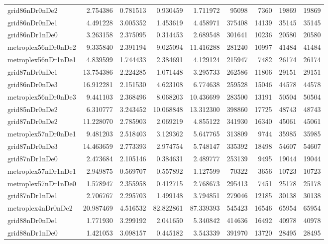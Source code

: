 \begin{longtable}{|l|r|r|r|r|r|r|r|r|}
grid86nDr0nDe2 & 2.754386 & 0.781513 & 0.930459 & 1.711972 & 95098 & 7360 & 19869 & 19869 \\
grid86nDr0nDe1 & 4.491228 & 3.005352 & 1.453619 & 4.458971 & 375408 & 14139 & 35145 & 35145 \\
grid86nDr1nDe0 & 3.263158 & 2.375095 & 0.314453 & 2.689548 & 301641 & 10236 & 20580 & 20580 \\
metroplex56nDr0nDe2 & 9.335840 & 2.391194 & 9.025094 & 11.416288 & 281240 & 10997 & 41484 & 41484 \\
metroplex56nDr1nDe1 & 4.839599 & 1.744433 & 2.384691 & 4.129124 & 215947 & 7482 & 26174 & 26174 \\
grid87nDr0nDe1 & 13.754386 & 2.224285 & 1.071448 & 3.295733 & 262586 & 11806 & 29151 & 29151 \\
grid86nDr0nDe3 & 16.912281 & 2.151530 & 4.623108 & 6.774638 & 259528 & 15046 & 44578 & 44578 \\
metroplex56nDr0nDe3 & 9.441103 & 2.368496 & 8.068203 & 10.436699 & 283500 & 13191 & 50504 & 50504 \\
grid85nDr0nDe2 & 6.310777 & 3.243452 & 10.068848 & 13.312300 & 398860 & 17725 & 48743 & 48743 \\
grid87nDr0nDe2 & 11.228070 & 2.785903 & 2.069219 & 4.855122 & 341930 & 16340 & 45061 & 45061 \\
metroplex57nDr0nDe1 & 9.481203 & 2.518403 & 3.129362 & 5.647765 & 313809 & 9744 & 35985 & 35985 \\
grid87nDr0nDe3 & 14.463659 & 2.773393 & 2.974754 & 5.748147 & 335392 & 18498 & 54607 & 54607 \\
grid87nDr1nDe0 & 2.473684 & 2.105146 & 0.384631 & 2.489777 & 253139 & 9495 & 19044 & 19044 \\
metroplex57nDr1nDe1 & 2.949875 & 0.569707 & 0.557892 & 1.127599 & 70322 & 3656 & 10723 & 10723 \\
metroplex57nDr1nDe0 & 1.578947 & 2.355958 & 0.412715 & 2.768673 & 295413 & 7451 & 25178 & 25178 \\
grid87nDr1nDe1 & 2.706767 & 2.295703 & 1.499148 & 3.794851 & 279046 & 12185 & 30138 & 30138 \\
metroplex4nDr0nDe2 & 20.987469 & 4.516532 & 82.822861 & 87.339393 & 545423 & 16546 & 65954 & 65954 \\
grid88nDr0nDe1 & 1.771930 & 3.299192 & 2.041650 & 5.340842 & 414636 & 16492 & 40978 & 40978 \\
grid88nDr1nDe0 & 1.421053 & 3.098157 & 0.445182 & 3.543339 & 391970 & 13720 & 28495 & 28495 \\

\end{longtable}
